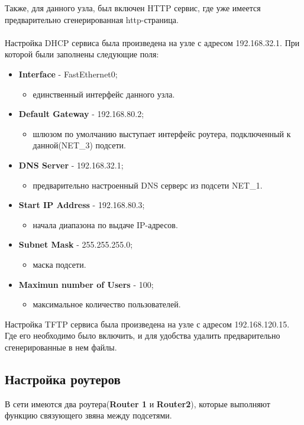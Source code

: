 \documentclass[14pt,a4paper,report]{report}
\begin{document}
Также, для данного узла, был включен HTTP сервис, где уже имеется предварительно сгенерированная http-страница.\\\\
Настройка DHCP сервиса была произведена на узле с адресом 192.168.32.1. При которой были заполнены следующие поля:
\begin{itemize}
\item \textbf{Interface} - FastEthernet0;
\begin{itemize}
\item единственный интерфейс данного узла.
\end{itemize}
\item \textbf{Default Gateway} - 192.168.80.2;
\begin{itemize}
\item шлюзом по умолчанию выступает интерфейс роутера, подключенный к данной(NET\_3) подсети.
\end{itemize}
\item \textbf{DNS Server} - 192.168.32.1;
\begin{itemize}
\item предварительно настроенный DNS серверс из подсети NET\_1.
\end{itemize}
\item \textbf{Start IP Address} - 192.168.80.3;
\begin{itemize}
\item начала диапазона по выдаче IP-адресов.
\end{itemize}
\item \textbf{Subnet Mask} - 255.255.255.0;
\begin{itemize}
\item маска подсети.
\end{itemize}
\item \textbf{Maximun number of Users} - 100;
\begin{itemize}
\item максимальное количество пользователей.
\end{itemize}
\end{itemize}
Настройка TFTP сервиса была произведена на узле с адресом 192.168.120.15. Где его необходимо было включить, и для удобства удалить предварительно сгенерированные в нем файлы.


\subsection{Настройка роутеров}
В сети имеются два роутера(\textbf{Router 1} и \textbf{Router2}), которые выполняют функцию связующего звяна между подсетями.
\end{document}
